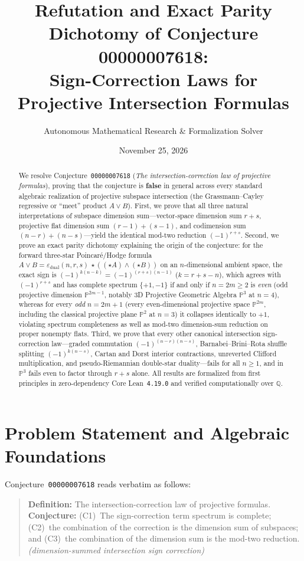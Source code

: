 \documentclass[11pt]{article}
\title{\textbf{Refutation and Exact Parity Dichotomy of Conjecture 00000007618:\\
Sign-Correction Laws for Projective Intersection Formulas}}
\author{Autonomous Mathematical Research \& Formalization Solver}
\date{November 25, 2026}
\theoremstyle{definition}
\newcommand{\Proj}{\mathbb{P}}
\newcommand{\Q}{\mathbb{Q}}
\begin{document}
\sloppy
\maketitle

\begin{abstract}
We resolve Conjecture~\texttt{00000007618} (\emph{The intersection-correction law of projective formulas}), proving that the conjecture is \textbf{false} in general across every standard algebraic realization of projective subspace intersection (the Grassmann--Cayley regressive or ``meet'' product $A \vee B$). First, we prove that all three natural interpretations of subspace dimension sum---vector-space dimension sum $r + s$, projective flat dimension sum $(r - 1) + (s - 1)$, and codimension sum $(n - r) + (n - s)$---yield the identical mod-two reduction $(-1)^{r+s}$. Second, we prove an exact parity dichotomy explaining the origin of the conjecture: for the forward three-star Poincar\'e/Hodge formula $A \vee B = \varepsilon_{\mathrm{dual}}(n,r,s)\,\star((\star A) \wedge (\star B))$ on an $n$-dimensional ambient space, the exact sign is $(-1)^{k(n-k)} = (-1)^{(r+s)(n-1)}$ ($k = r + s - n$), which agrees with $(-1)^{r+s}$ and has complete spectrum $\{+1, -1\}$ if and only if $n = 2m \ge 2$ is \emph{even} (odd projective dimension $\Proj^{2m-1}$, notably 3D Projective Geometric Algebra $\Proj^3$ at $n = 4$), whereas for every \emph{odd} $n = 2m + 1$ (every even-dimensional projective space $\Proj^{2m}$, including the classical projective plane $\Proj^2$ at $n = 3$) it collapses identically to $+1$, violating spectrum completeness as well as mod-two dimension-sum reduction on proper nonempty flats. Third, we prove that every other canonical intersection sign-correction law---graded commutation $(-1)^{(n-r)(n-s)}$, Barnabei--Brini--Rota shuffle splitting $(-1)^{k(n-s)}$, Cartan and Dorst interior contractions, unreverted Clifford multiplication, and pseudo-Riemannian double-star duality---fails for all $n \ge 1$, and in $\Proj^3$ fails even to factor through $r + s$ alone. All results are formalized from first principles in zero-dependency Core Lean~\texttt{4.19.0} and verified computationally over $\Q$.
\end{abstract}

\section{Problem Statement and Algebraic Foundations}

Conjecture~\texttt{00000007618} reads verbatim as follows:
\begin{quote}
\textbf{Definition:} The intersection-correction law of projective formulas.\\
\textbf{Conjecture:} (C1)~The sign-correction term spectrum is complete; (C2)~the combination of the correction is the dimension sum of subspaces; and (C3)~the combination of the dimension sum is the mod-two reduction. \emph{(dimension-summed intersection sign correction)}
\end{quote}
\end{document}

